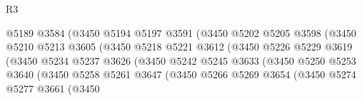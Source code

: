 \begin{lexlean}{R3}
\begin{coremodule}
                                      @5189
                                      @3584
                                      (@3450
                                        @5194
                                        @5197
                                        @3591
                                        (@3450
                                          @5202
                                          @5205
                                          @3598
                                          (@3450
                                            @5210
                                            @5213
                                            @3605
                                            (@3450
                                              @5218
                                              @5221
                                              @3612
                                              (@3450
                                                @5226
                                                @5229
                                                @3619
                                                (@3450
                                                  @5234
                                                  @5237
                                                  @3626
                                                  (@3450
                                                    @5242
                                                    @5245
                                                    @3633
                                                    (@3450
                                                      @5250
                                                      @5253
                                                      @3640
                                                      (@3450
                                                        @5258
                                                        @5261
                                                        @3647
                                                        (@3450
                                                          @5266
                                                          @5269
                                                          @3654
                                                          (@3450
                                                            @5274
                                                            @5277
                                                            @3661
                                                            (@3450

\end{coremodule}
\end{lexlean}
